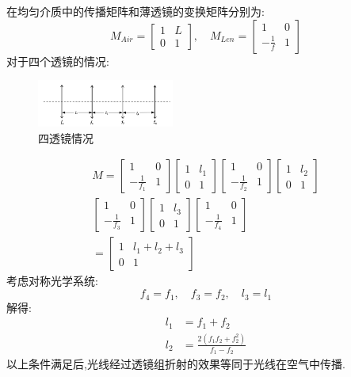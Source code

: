 \documentclass[UTF8]{gapd}
\begin{document}
在均匀介质中的传播矩阵和薄透镜的变换矩阵分别为:
\begin{equation}
  M_{Air}=
  \begin{bmatrix}
      1 & L\\
      0 & 1
  \end{bmatrix} ,\quad M_{Len}=\begin{bmatrix}
    1 & 0\\
    -\frac{1}{f} & 1
\end{bmatrix}  
\end{equation}
对于四个透镜的情况:
\begin{figure}
  \centering
  \includegraphics[width=0.4\textwidth]{images/4.png}
  \caption{四透镜情况}
\end{figure}
\begin{multline}
  M=
  \begin{bmatrix}
      1 & 0\\
      -\frac{1}{f_1} & 1
  \end{bmatrix}\begin{bmatrix}
      1&l_1\\
      0&1
  \end{bmatrix}\begin{bmatrix}
      1 & 0\\
      -\frac{1}{f_2} & 1
  \end{bmatrix}\begin{bmatrix}
      1&l_2\\
      0&1
  \end{bmatrix}\\
  \begin{bmatrix}
      1 & 0\\
      -\frac{1}{f_3} & 1
  \end{bmatrix}\begin{bmatrix}
      1&l_3\\
      0&1
  \end{bmatrix}\begin{bmatrix}
      1 & 0\\
      -\frac{1}{f_4} & 1
  \end{bmatrix}\\
  =\begin{bmatrix}
      1&l_1+l_2+l_3\\
      0&1
  \end{bmatrix}
\end{multline}
考虑对称光学系统:
\begin{equation}
  f_4=f_1,\quad f_3=f_2,\quad l_3=l_1
\end{equation}
解得:
\begin{align}
  l_1&=f_1+f_2\\
  l_2&=\frac{2(f_1f_2+f_2^2)}{f_1-f_2}
\end{align}
以上条件满足后,光线经过透镜组折射的效果等同于光线在空气中传播.
\end{document}
